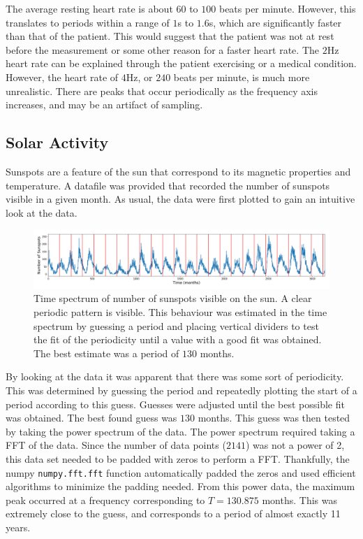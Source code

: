 \message{ !name(Assn2.tex)}\documentclass[twocolumn]{article}
\begin{document}
The average resting heart rate is about $60$ to $100$ beats per minute. However,
this translates to periods within a range of $1$s to $1.6$s, which are
significantly faster than that of the patient. This would suggest that the
patient was not at rest before the measurement or some other reason for a faster
heart rate. The $2$Hz heart rate can be explained through the patient
exercising or a medical condition. However, the heart rate of $4$Hz,
or $240$ beats per minute, is much more unrealistic. There are peaks
that occur periodically as the frequency axis increases, and may be an
artifact of sampling.

\subsection{Solar Activity}
Sunspots are a feature of the sun that correspond to its magnetic properties and temperature. A datafile was provided that recorded the number of sunspots visible in a given month. As usual, the data were first plotted to gain an intuitive look at the data.

\begin{figure}
\centering
\includegraphics[width=\textwidth]{"sunspot time"}
\caption{Time spectrum of number of sunspots visible on the sun. A clear periodic pattern is visible. This behaviour was estimated in the time spectrum by guessing a period and placing vertical dividers to test the fit of the periodicity until a value with a good fit was obtained. The best estimate was a period of $130$ months.}
\label{fig:sunspottime}
\end{figure}

By looking at the data it was apparent that there was some sort of periodicity. This was determined by guessing the period and repeatedly plotting the start of a period according to this guess. Guesses were adjusted until the best possible fit was obtained. The best found guess was $130$ months. This guess was then tested by taking the power spectrum of the data. The power spectrum required taking a FFT of the data. Since the number of data points ($2141$) was not a power of 2, this data set needed to be padded with zeros to perform a FFT. Thankfully, the numpy \texttt{numpy.fft.fft} function automatically padded the zeros and used efficient algorithms to minimize the padding needed.  From this power data, the maximum peak occurred at a frequency corresponding to $T=130.875$ months. This was extremely close to the guess, and corresponds to a period of almost exactly 11 years.
\end{document}
